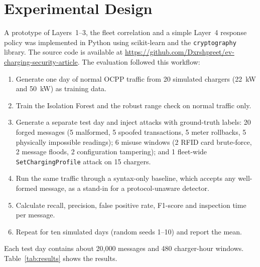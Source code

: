 \documentclass[runningheads]{llncs}
\begin{document}
\section{Experimental Design}
A prototype of Layers~1--3, the fleet correlation and a simple Layer~4 response policy was implemented in Python using scikit-learn and the \texttt{cryptography} library. The source code is available at \url{https://github.com/Dxrshpreet/ev-charging-security-article}. The evaluation followed this workflow:
\begin{enumerate}
  \item Generate one day of normal OCPP traffic from 20 simulated chargers (22~kW and 50~kW) as training data.
  \item Train the Isolation Forest and the robust range check on normal traffic only.
  \item Generate a separate test day and inject attacks with ground-truth labels: 20 forged messages (5 malformed, 5 spoofed transactions, 5 meter rollbacks, 5 physically impossible readings); 6 misuse windows (2 RFID card brute-force, 2 message floods, 2 configuration tampering); and 1 fleet-wide \texttt{SetChargingProfile} attack on 15 chargers.
  \item Run the same traffic through a syntax-only baseline, which accepts any well-formed message, as a stand-in for a protocol-unaware detector.
  \item Calculate recall, precision, false positive rate, F1-score and inspection time per message.
  \item Repeat for ten simulated days (random seeds 1--10) and report the mean.
\end{enumerate}
Each test day contains about 20{,}000 messages and 480 charger-hour windows. Table~\ref{tab:results} shows the results.
\end{document}
